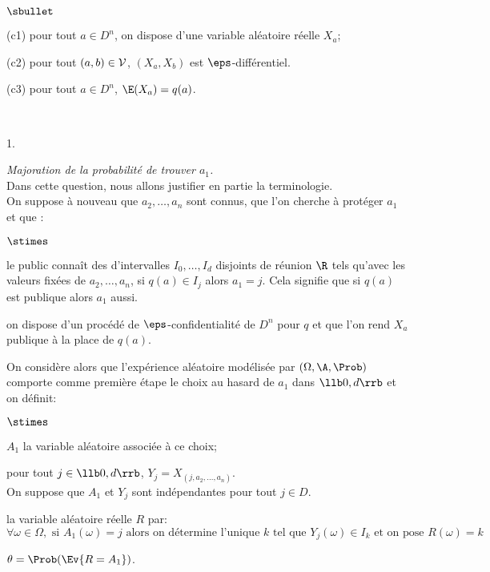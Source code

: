 \documentclass[11pt]{article}%
\begin{document}
\begin{liste}{$\sbullet$}
\item[(c1)] pour tout $a\in D^n$, on dispose d'une variable aléatoire
  réelle $X_a$;
\item[(c2)] pour tout $(a,b) \in {\cal V}$, $(X_a,X_b)$ est
  $\eps$-différentiel.
\item[(c3)] pour tout $a\in D^n$, $\E(X_a) = q(a)$.
\end{liste}~\\[-.4cm]
\begin{noliste}{1.}
  \setcounter{enumi}{12} %
  \setlength{\itemsep}{4mm}
\item {\em Majoration de la probabilité de trouver $a_1$.}\\
  Dans cette question, nous allons justifier en partie la
  terminologie.\\
  On suppose à nouveau que $a_2, \ldots ,a_n$ sont connus, que l'on
  cherche à protéger $a_1$ et que :
  \begin{noliste}{$\stimes$}
  \item le public connaît des d'intervalles $I_0,\ldots,I_d$ disjoints
    de réunion $\R$ tels qu'avec les valeurs fixées de $a_2, \ldots,
    a_n$, si $q(a) \in I_j$ alors $a_1 = j$. Cela signifie que si
    $q(a)$ est publique alors $a_1$ aussi.
  \item on dispose d'un procédé de $\eps$-confidentialité de $D^n$
    pour $q$ et que l'on rend $X_a$ publique à la place de $q(a)$.
  \end{noliste}
  On considère alors que l'expérience aléatoire modélisée par
  $(\Omega, \A, \Prob)$ comporte comme première étape le choix au
  hasard de $a_1$ dans $\llb 0, d \rrb$ et on définit:
  \begin{noliste}{$\stimes$}
  \item $A_1$ la variable aléatoire associée à ce choix;
  \item pour tout $j \in \llb 0, d \rrb$, $Y_j = X_{(j, a_2, \ldots,
      a_n)}$. \\
    On suppose que $A_1$ et $Y_j$ sont indépendantes pour tout $j\in
    D$.
  \item la variable aléatoire réelle $R$ par:
    \[
    \forall \omega\in\Omega, \text{ si } A_1(\omega) = j \text{ alors
      on détermine l'unique } k \text{ tel que } Y_j(\omega)\in I_k
    \text{ et on pose } R(\omega)=k
    \]
  \item $\theta = \Prob(\Ev{R = A_1})$.
  \end{noliste}



\end{noliste}
\end{document}
